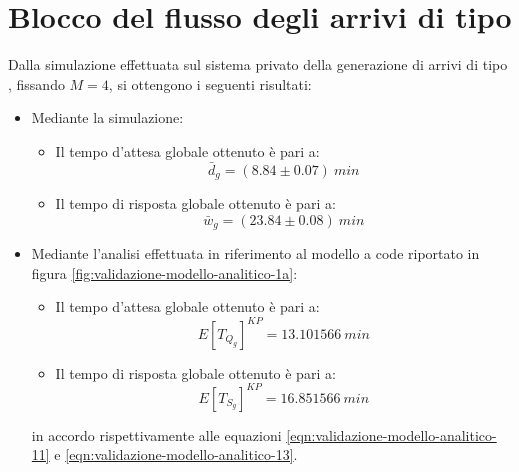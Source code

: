 \section{Blocco del flusso degli arrivi di tipo \sr{}}
Dalla simulazione effettuata sul sistema privato della generazione di arrivi di tipo \sr{}, fissando $M=4$, si ottengono i seguenti risultati:
\begin{itemize}
\item Mediante la simulazione:
\begin{itemize}
\item Il tempo d'attesa globale ottenuto è pari a:
\begin{equation}
\bar{d}_g = (8.84 \pm 0.07)\ min
\end{equation}
\item Il tempo di risposta globale ottenuto è pari a:
\begin{equation}
\bar{w}_g = (23.84 \pm 0.08)\ min
\end{equation}
\end{itemize}

\item Mediante l'analisi effettuata in riferimento al modello a code riportato in figura \ref{fig:validazione-modello-analitico-1a}:
\begin{itemize}
\item Il tempo d'attesa globale ottenuto è pari a:
\begin{equation}
E[T_{Q_g}]^{KP} = 13.101566\ min 
\end{equation}
\item Il tempo di risposta globale ottenuto è pari a:
\begin{equation}
E[T_{S_g}]^{KP} = 16.851566\ min 
\end{equation}
\end{itemize}
in accordo rispettivamente alle equazioni \ref{eqn:validazione-modello-analitico-11} e \ref{eqn:validazione-modello-analitico-13}.
\end{itemize}

